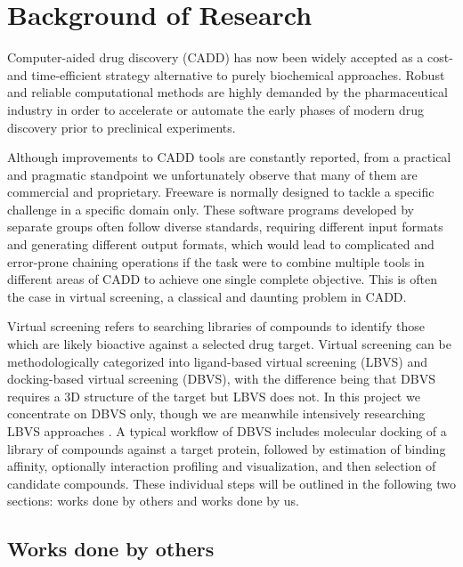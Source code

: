 \documentclass[a4paper,12pt]{article}
\begin{document}
\newpage %
\section*{Background of Research}

Computer-aided drug discovery (CADD) has now been widely accepted as a cost- and time-efficient strategy alternative to purely biochemical approaches. Robust and reliable computational methods are highly demanded by the pharmaceutical industry in order to accelerate or automate the early phases of modern drug discovery prior to preclinical experiments.

Although improvements to CADD tools are constantly reported, from a practical and pragmatic standpoint we unfortunately observe that many of them are commercial and proprietary. Freeware is normally designed to tackle a specific challenge in a specific domain only. These software programs developed by separate groups often follow diverse standards, requiring different input formats and generating different output formats, which would lead to complicated and error-prone chaining operations if the task were to combine multiple tools in different areas of CADD to achieve one single complete objective. This is often the case in virtual screening, a classical and daunting problem in CADD.

Virtual screening refers to searching libraries of compounds to identify those which are likely bioactive against a selected drug target. Virtual screening can be methodologically categorized into ligand-based virtual screening (LBVS) and docking-based virtual screening (DBVS), with the difference being that DBVS requires a 3D structure of the target but LBVS does not. In this project we concentrate on DBVS only, though we are meanwhile intensively researching LBVS approaches \citep{1749}. A typical workflow of DBVS includes molecular docking of a library of compounds against a target protein, followed by estimation of binding affinity, optionally interaction profiling and visualization, and then selection of candidate compounds. These individual steps will be outlined in the following two sections: works done by others and works done by us.

\subsection*{Works done by others}
\end{document}
